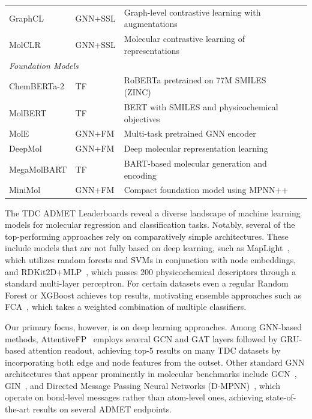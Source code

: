 \documentclass[12pt]{article}
\begin{document}
\begin{table}[htbp]
\begin{tabular}{llp{4.2cm}l}
GraphCL & GNN+SSL & Graph-level contrastive learning with augmentations & \cite{contrativeLearning} \\
MolCLR & GNN+SSL & Molecular contrastive learning of representations & \cite{molclr} \\
\midrule
\multicolumn{4}{l}{\emph{Foundation Models}} \\
\midrule
ChemBERTa-2 & TF & RoBERTa pretrained on 77M SMILES (ZINC) & \cite{chemberta2} \\
MolBERT & TF & BERT with SMILES and physicochemical objectives & \cite{molbert} \\
MolE & GNN+FM & Multi-task pretrained GNN encoder & \cite{molE} \\
DeepMol & GNN+FM & Deep molecular representation learning & \cite{deepMol} \\
MegaMolBART & TF & BART-based molecular generation and encoding & \cite{mmelon} \\
MiniMol & GNN+FM & Compact foundation model using MPNN++ & \cite{miniMol} \\
\bottomrule
\end{tabular}
\end{table}

The TDC ADMET Leaderboards reveal a diverse landscape of machine learning models for molecular regression and classification tasks. Notably, several of the top-performing approaches rely on comparatively simple architectures. These include models that are not fully based on deep learning, such as MapLight~\cite{maplight}, which utilizes random forests and SVMs in conjunction with node embeddings, and RDKit2D+MLP~\cite{rdkit2d_mlp}, which passes 200 physicochemical descriptors through a standard multi-layer perceptron. For certain datasets even a regular Random Forest or XGBoost achieves top results, motivating ensemble approaches such as FCA~\cite{cfa}, which takes a weighted combination of multiple classifiers.

Our primary focus, however, is on deep learning approaches. Among GNN-based methods, AttentiveFP~\cite{attentiveFP} employs several GCN and GAT layers followed by GRU-based attention readout, achieving top-5 results on many TDC datasets by incorporating both edge and node features from the outset. Other standard GNN architectures that appear prominently in molecular benchmarks include GCN~\cite{kipf2017gcn}, GIN~\cite{xu2019gin}, and Directed Message Passing Neural Networks (D-MPNN)~\cite{yang2019dmpnn}, which operate on bond-level messages rather than atom-level ones, achieving state-of-the-art results on several ADMET endpoints.
\end{document}
